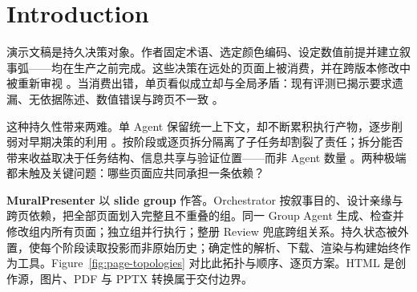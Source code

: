
\begin{abstract}

一张幻灯片可以局部正确却与整册矛盾：前页定义的术语在远处被改写，视觉编码反转，或数值前提被引用却从未建立。这类失败源于创作决策跨阶段、跨页持续，而执行上下文并不持续。因此，缺失的设计变量是责任粒度：哪些页面必须由同一主体共同负责。\textbf{MuralPresenter} 外置持久整册状态，将制作委派给依赖对齐、互不重叠的 slide group，每组由同一 Group Agent 联合生成、渲染与修改。四阶段工作流依次完成内容接地、冻结整册计划、并行的分组制作与整册复审。配套数据管线向三条 Query Track 注入 Style profile 和任务条件化的长程依赖，再将依赖编译为轨迹过滤的 checklist。我们以 1,000 条经质量控制的轨迹训练 MuralPresenter-9B，并以更大的异构队列训练 MuralPresenter-27B；同时提出 \textbf{ThreadBench}，分开评估中间过程证据与最终制品质量。在 PresentBench 上，MuralPresenter-9B 与 MuralPresenter-27B 的 Overall 分别为  和 ；在 ThreadBench 上，二者 Final 分别为  和 。受控消融进一步表明 。这些结果说明，显式责任与可审计交接能支撑长程演示创作。

\end{abstract}

\section{Introduction}

演示文稿是持久决策对象。作者固定术语、选定颜色编码、设定数值前提并建立叙事弧——均在生产之前完成。这些决策在远处的页面上被消费，并在跨版本修改中被重新审视 \citep{maheshwari-etal-2024-presentations,zheng2025pptagent,xu-etal-2025-pregenie}。当消费出错，单页看似成立却与全局矛盾：现有评测已揭示要求遗漏、无依据陈述、数值错误与跨页不一致 \citep{chen2026presentbench}。

这种持久性带来两难。单 Agent 保留统一上下文，却不断累积执行产物，逐步削弱对早期决策的利用 \citep{sun2025contextfolding}。按阶段或逐页拆分隔离了子任务却割裂了责任；拆分能否带来收益取决于任务结构、信息共享与验证位置——而非 Agent 数量 \citep{kim2025scalingagents}。两种极端都未触及关键问题：哪些页面应共同承担一条依赖？

\textbf{MuralPresenter} 以 \textbf{slide group} 作答。Orchestrator 按叙事目的、设计亲缘与跨页依赖，把全部页面划入完整且不重叠的组。同一 Group Agent 生成、检查并修改组内所有页面；独立组并行执行；整册 Review 兜底跨组关系。持久状态被外置，使每个阶段读取投影而非原始历史；确定性的解析、下载、渲染与构建始终作为工具。Figure~\ref{fig:page-topologies} 对比此拓扑与顺序、逐页方案。HTML 是创作源，图片、PDF 与 PPTX 转换属于交付边界。

